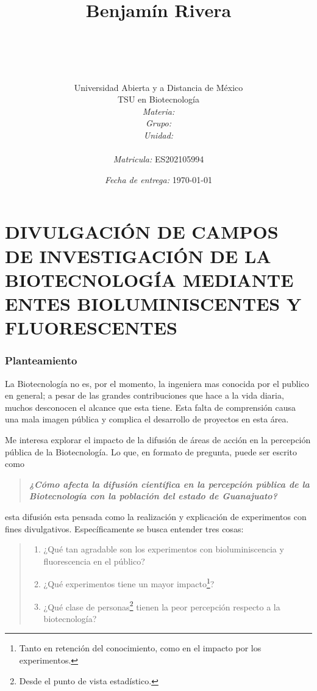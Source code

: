 \documentclass[12pt]{article}
\title{
	\ \\ Benjam\'in Rivera \\
	\bf{\titulo}\\\ \\}
\author{
	{\Huge Universidad Abierta y a Distancia de México} \\
	TSU en Biotecnolog\'ia \\
	\textit{Materia:} \materia \\
	\textit{Grupo:} \grupo \\
	\textit{Unidad:} \unidad \\
	\\
	\textit{Matricula:} ES202105994 }
\date{\textit{Fecha de entrega:} \today}
\newcommand{\tema}[0]{divulgación de campos de investigación de la biotecnología mediante entes bioluminiscentes y fluorescentes}
\begin{document}
\maketitle\newpage

\tableofcontents
\listoffigures
\newpage

\part*{\MakeUppercase{\tema}}



\section{Planteamiento}
	
	\par La Biotecnología no es, por el momento, la ingeniera mas conocida por el publico en general; a pesar de las grandes contribuciones que hace a la vida diaria, muchos desconocen el alcance que esta tiene. Esta falta de comprensión causa una mala imagen pública y complica el desarrollo de proyectos en esta área.
	\par Me interesa explorar el impacto de la difusión de áreas de acción en la percepción pública de la Biotecnología. Lo que, en formato de pregunta, puede ser escrito como
	\begin{quote}
		\textbf{\textit{¿Cómo afecta la difusión científica en la percepción pública de la Biotecnología con la población del estado de Guanajuato?}}
	\end{quote}
	  
	\noindent esta difusión esta pensada como la realización y explicación de experimentos con fines divulgativos. Específicamente se busca entender tres cosas:
	
	\begin{quote}
	\begin{enumerate}\it
			\item ¿Qué tan agradable son los experimentos con bioluminiscencia y fluorescencia en el público?
			\item ¿Qué experimentos tiene un mayor impacto\footnote{Tanto en retención del conocimiento, como en el impacto por los experimentos.}?
			\item ¿Qué clase de personas\footnote{Desde el punto de vista estadístico.} tienen la peor percepción respecto a la biotecnología? 

	\end{enumerate}
	\end{quote}
\end{document}
